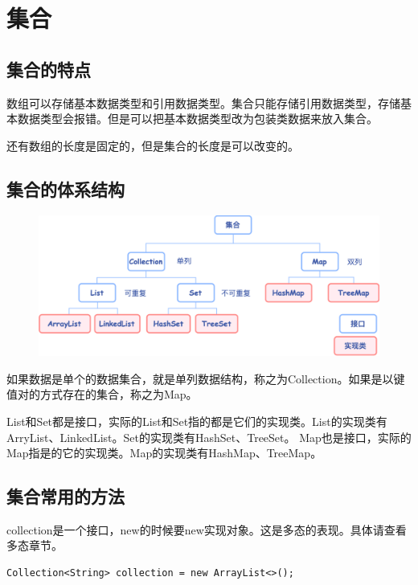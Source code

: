 \section*{集合}\label{sec:Collection}



\subsection*{集合的特点}
数组可以存储基本数据类型和引用数据类型。集合只能存储引用数据类型，存储基本数据类型会报错。但是可以把基本数据类型改为包装类数据来放入集合。


还有数组的长度是固定的，但是集合的长度是可以改变的。

\subsection*{集合的体系结构}

\begin{figure}
    \centering
    \includegraphics[width=.7\textwidth]{img/collection/1.png}
\end{figure}



如果数据是单个的数据集合，就是单列数据结构，称之为Collection。如果是以键值对的方式存在的集合，称之为Map。

List和Set都是接口，实际的List和Set指的都是它们的实现类。List的实现类有ArryList、LinkedList。Set的实现类有HashSet、TreeSet。
Map也是接口，实际的Map指是的它的实现类。Map的实现类有HashMap、TreeMap。

\subsection*{集合常用的方法}
collection是一个接口，new的时候要new实现对象。这是多态的表现。具体请查看多态章节。
\begin{lstlisting}[style=Java]
Collection<String> collection = new ArrayList<>();
\end{lstlisting}

